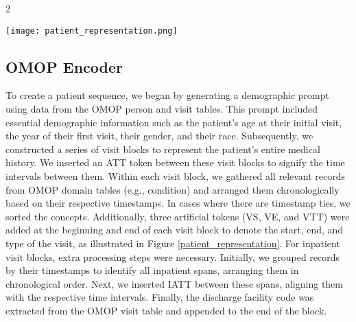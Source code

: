\begin{multicols}{2}
\begin{figure*}
    \centering
    \texttt{[image: patient\_representation.png]}
    \label{patient_representation}
\end{figure*}
\subsection{OMOP Encoder}
To create a patient sequence, we began by generating a demographic prompt using data from the OMOP person and visit tables. This prompt included essential demographic information such as the patient's age at their initial visit, the year of their first visit, their gender, and their race. Subsequently, we constructed a series of visit blocks to represent the patient's entire medical history. We inserted an ATT token between these visit blocks to signify the time intervals between them. Within each visit block, we gathered all relevant records from OMOP domain tables (e.g., condition) and arranged them chronologically based on their respective timestamps. In cases where there are timestamp ties, we sorted the concepts. Additionally, three artificial tokens (VS, VE, and VTT) were added at the beginning and end of each visit block to denote the start, end, and type of the visit, as illustrated in Figure \ref{patient_representation}. For inpatient visit blocks, extra processing steps were necessary. Initially, we grouped records by their timestamps to identify all inpatient spans, arranging them in chronological order. Next, we inserted IATT between these spans, aligning them with the respective time intervals. Finally, the discharge facility code was extracted from the OMOP visit table and appended to the end of the block.


\end{multicols}
